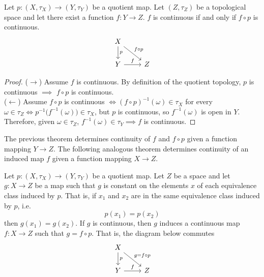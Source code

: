     \begin{theorem}
    Let $p: (X, \tau_X) \longrightarrow (Y, \tau_Y)$ be a quotient map. Let $(Z, \tau_Z)$ be a topological space and let there exist a function $f: Y \longrightarrow Z$. $f$ is continuous if and only if $f \circ p$ is continuous. 
    \[\begin{tikzcd}
        X \arrow{d}{p} \arrow{rd}{f \circ p}\\
        Y \arrow{r}{f} & Z
    \end{tikzcd}\]
    \end{theorem}
    \begin{proof}
    ($\rightarrow$) Assume $f$ is continuous. By definition of the quotient topology, $p$ is continuous $\implies$ $f \circ p$ is continuous. \\
    ($\leftarrow$) Assume $f \circ p$ is continuous $\iff (f \circ p)^{-1} (\omega) \in \tau_X$ for every $\omega \in \tau_Z \iff p^{-1} \big( f^{-1}(\omega) \big) \in \tau_X$, but $p$ is continuous, so $f^{-1}(\omega)$ is open in $Y$. Therefore, given $\omega \in \tau_{Z}$, $f^{-1} (\omega) \in \tau_Y \implies f$ is continuous. 
    \end{proof}

    The previous theorem determines continuity of $f$ and $f \circ p$ given a function mapping $Y \longrightarrow Z$. The following analogous theorem determines continuity of an induced map $f$ given a function mapping $X \longrightarrow Z$. 

    \begin{theorem}
    Let $p: (X, \tau_X )\longrightarrow (Y, \tau_Y)$ be a quotient map. Let $Z$ be a space and let $g: X \longrightarrow Z$ be a map such that $g$ is constant on the elements $x$ of each equivalence class induced by $p$. That is, if $x_1$ and $x_2$ are in the same equivalence class induced by $p$, i.e. 
    \[p(x_1) = p(x_2)\]
    then $g(x_1) = g(x_2)$. If $g$ is continuous, then $g$ induces a continuous map $f: X \longrightarrow Z$ such that $g = f \circ p$. That is, 
    the diagram below commutes 
    \[\begin{tikzcd}
        X \arrow{d}{p} \arrow{rd}{g=f \circ p}\\
        Y \arrow{r}{f} & Z
    \end{tikzcd}\]
    \end{theorem}

